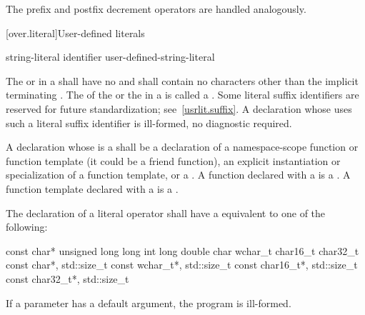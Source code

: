 \pnum
The prefix and postfix decrement operators
\tcode{-{-}}
are handled analogously.

[over.literal]{User-defined literals}%
%

\begin{bnf}
\br
     string-literal identifier\br
     user-defined-string-literal
\end{bnf}

\pnum
The  or 
in a  shall have no
 and shall contain no characters other than the
implicit terminating .
The  of the  or
the  in a  is called a
.
Some literal suffix identifiers are reserved for future standardization;
see~\ref{usrlit.suffix}.  A declaration whose  uses
such a literal suffix identifier is ill-formed, no diagnostic required.

\pnum
A declaration whose  is a
 shall be a declaration of a namespace-scope
function or function template (it could be a friend
function), an explicit instantiation or specialization of a
function template, or a .
A function declared with a  is a . A function template declared with a 
is a .

\pnum
The declaration of a literal operator shall have a
 equivalent to one of the following:

\begin{codeblock}
const char*
unsigned long long int
long double
char
wchar_t
char16_t
char32_t
const char*, std::size_t
const wchar_t*, std::size_t
const char16_t*, std::size_t
const char32_t*, std::size_t
\end{codeblock}

If a parameter has a default argument, the program is
ill-formed.

